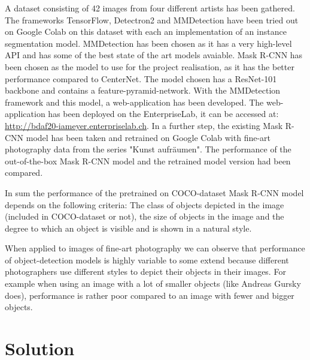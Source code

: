 \documentclass[a4paper,10pt,hidelinks]{scrartcl}
\begin{document}
A dataset consisting of 42 images from four different artists has been gathered. The frameworks TensorFlow, Detectron2 and MMDetection have been tried out on Google Colab on this dataset with each an implementation of an instance segmentation model. MMDetection has been chosen as it has a very high-level API and has some of the best state of the art models avaiable. Mask R-CNN has been chosen as the model to use for the project realisation, as it has the better performance compared to CenterNet. The model chosen has a ResNet-101 backbone and contains a feature-pyramid-network. With the MMDetection framework and this model, a web-application has been developed. The web-application has been deployed on the EnterpriseLab, it can be accessed at: \url{http://bdaf20-iameyer.enterpriselab.ch}. In a further step, the existing Mask R-CNN model has been taken and retrained on Google Colab with fine-art photography data from the series "Kunst aufräumen". The performance of the out-of-the-box Mask R-CNN model and the retrained model version had been compared.

In sum the performance of the pretrained on COCO-dataset Mask R-CNN model depends on the following criteria: The class of objects depicted in the image (included in COCO-dataset or not), the size of objects in the image and the degree to which an object is visible and is shown in a natural style.

When applied to images of fine-art photography we can observe that performance of object-detection models is highly variable to some extend because different photographers use different styles to depict their objects in their images. For example when using an image with a lot of smaller objects (like Andreas Gursky does), performance is rather poor compared to an image with fewer and bigger objects.

\section{\fontsize{14}{16}\selectfont Solution}
\end{document}

